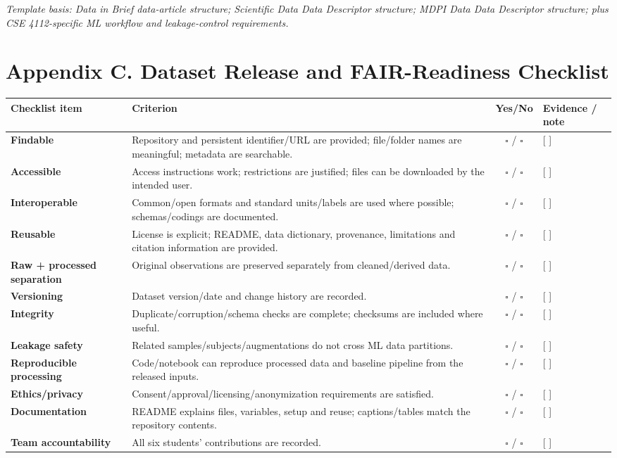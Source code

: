 \documentclass[11pt,a4paper]{article}
\begin{document}
\vspace{0.5em}
\noindent
{\footnotesize\textit{Template basis: Data in Brief data-article structure; Scientific Data Data Descriptor structure; MDPI Data Data Descriptor structure; plus CSE 4112-specific ML workflow and leakage-control requirements.}}

\vspace{1.5em}

\section*{Appendix C. Dataset Release and FAIR-Readiness Checklist}
\noindent
\begin{tabularx}{\textwidth}{|p{3.2cm}|X|c|p{2.5cm}|}
\hline
\textbf{Checklist item} & \textbf{Criterion} & \textbf{Yes/No} & \textbf{Evidence / note} \\
\hline
\textbf{Findable} & Repository and persistent identifier/URL are provided; file/folder names are meaningful; metadata are searchable. & $\square$ / $\square$ & [ ] \\
\hline
\textbf{Accessible} & Access instructions work; restrictions are justified; files can be downloaded by the intended user. & $\square$ / $\square$ & [ ] \\
\hline
\textbf{Interoperable} & Common/open formats and standard units/labels are used where possible; schemas/codings are documented. & $\square$ / $\square$ & [ ] \\
\hline
\textbf{Reusable} & License is explicit; README, data dictionary, provenance, limitations and citation information are provided. & $\square$ / $\square$ & [ ] \\
\hline
\textbf{Raw + processed separation} & Original observations are preserved separately from cleaned/derived data. & $\square$ / $\square$ & [ ] \\
\hline
\textbf{Versioning} & Dataset version/date and change history are recorded. & $\square$ / $\square$ & [ ] \\
\hline
\textbf{Integrity} & Duplicate/corruption/schema checks are complete; checksums are included where useful. & $\square$ / $\square$ & [ ] \\
\hline
\textbf{Leakage safety} & Related samples/subjects/augmentations do not cross ML data partitions. & $\square$ / $\square$ & [ ] \\
\hline
\textbf{Reproducible processing} & Code/notebook can reproduce processed data and baseline pipeline from the released inputs. & $\square$ / $\square$ & [ ] \\
\hline
\textbf{Ethics/privacy} & Consent/approval/licensing/anonymization requirements are satisfied. & $\square$ / $\square$ & [ ] \\
\hline
\textbf{Documentation} & README explains files, variables, setup and reuse; captions/tables match the repository contents. & $\square$ / $\square$ & [ ] \\
\hline
\textbf{Team accountability} & All six students’ contributions are recorded. & $\square$ / $\square$ & [ ] \\
\hline
\end{tabularx}
\end{document}
